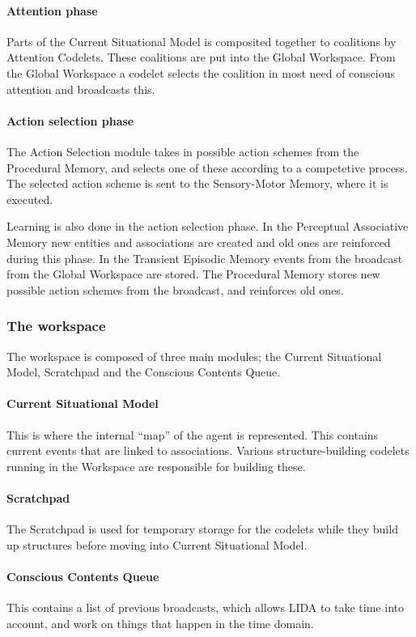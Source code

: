 \paragraph{Attention phase}
Parts of the Current Situational Model is composited together to coalitions by
Attention Codelets. These coalitions are put into the Global Workspace.
From the Global Workspace a codelet selects the coalition in most need of
conscious attention and broadcasts this.

\paragraph{Action selection phase}
The Action Selection module takes in possible action schemes from the
Procedural Memory, and selects one of these according to a competetive process.
The selected action scheme is sent to the Sensory-Motor Memory, where it is
executed.

Learning is also done in the action selection phase. In the Perceptual
Associative Memory new entities and associations are created and old ones are
reinforced during this phase. In the Transient Episodic Memory events from the
broadcast from the Global Workspace are stored. The Procedural Memory stores
new possible action schemes from the broadcast, and reinforces old ones.

\subsubsection{The workspace}
The workspace is composed of three main modules; the Current Situational Model,
Scratchpad and the Conscious Contents Queue.

\paragraph{Current Situational Model} This is where the internal ``map'' of the
agent is represented. This contains current events that are linked to
associations. Various structure-building codelets running in the Workspace are
responsible for building these.

\paragraph{Scratchpad} The Scratchpad is used for temporary storage for the
codelets while they build up structures before moving into Current Situational
Model.

\paragraph{Conscious Contents Queue}
This contains a list of previous broadcasts, which allows LIDA to take time
into account, and work on things that happen in the time domain.

